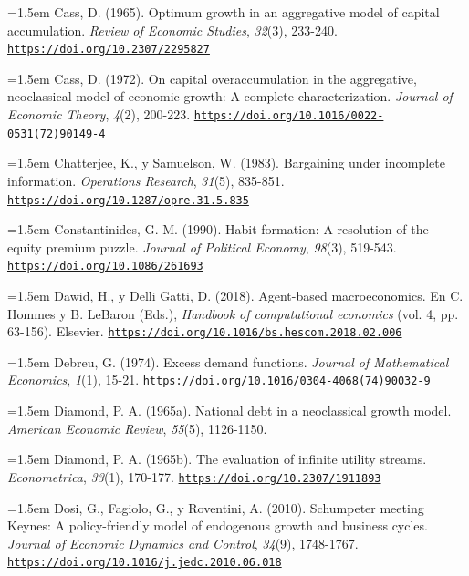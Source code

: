 \documentclass[10pt,a4paper]{article}
\begin{document}
\noindent\hangindent=1.5em Cass, D. (1965). Optimum growth in an aggregative model of capital accumulation. \textit{Review of Economic Studies}, \textit{32}(3), 233-240. \href{https://doi.org/10.2307/2295827}{\nolinkurl{https://doi.org/10.2307/2295827}}

\noindent\hangindent=1.5em Cass, D. (1972). On capital overaccumulation in the aggregative, neoclassical model of economic growth: A complete characterization. \textit{Journal of Economic Theory}, \textit{4}(2), 200-223. \href{https://doi.org/10.1016/0022-0531(72)90149-4}{\nolinkurl{https://doi.org/10.1016/0022-0531(72)90149-4}}

\noindent\hangindent=1.5em Chatterjee, K., y Samuelson, W. (1983). Bargaining under incomplete information. \textit{Operations Research}, \textit{31}(5), 835-851. \href{https://doi.org/10.1287/opre.31.5.835}{\nolinkurl{https://doi.org/10.1287/opre.31.5.835}}

\noindent\hangindent=1.5em Constantinides, G. M. (1990). Habit formation: A resolution of the equity premium puzzle. \textit{Journal of Political Economy}, \textit{98}(3), 519-543. \href{https://doi.org/10.1086/261693}{\nolinkurl{https://doi.org/10.1086/261693}}

\noindent\hangindent=1.5em Dawid, H., y Delli Gatti, D. (2018). Agent-based macroeconomics. En C. Hommes y B. LeBaron (Eds.), \textit{Handbook of computational economics} (vol. 4, pp. 63-156). Elsevier. \href{https://doi.org/10.1016/bs.hescom.2018.02.006}{\nolinkurl{https://doi.org/10.1016/bs.hescom.2018.02.006}}

\noindent\hangindent=1.5em Debreu, G. (1974). Excess demand functions. \textit{Journal of Mathematical Economics}, \textit{1}(1), 15-21. \href{https://doi.org/10.1016/0304-4068(74)90032-9}{\nolinkurl{https://doi.org/10.1016/0304-4068(74)90032-9}}

\noindent\hangindent=1.5em Diamond, P. A. (1965a). National debt in a neoclassical growth model. \textit{American Economic Review}, \textit{55}(5), 1126-1150.

\noindent\hangindent=1.5em Diamond, P. A. (1965b). The evaluation of infinite utility streams. \textit{Econometrica}, \textit{33}(1), 170-177. \href{https://doi.org/10.2307/1911893}{\nolinkurl{https://doi.org/10.2307/1911893}}

\noindent\hangindent=1.5em Dosi, G., Fagiolo, G., y Roventini, A. (2010). Schumpeter meeting Keynes: A policy-friendly model of endogenous growth and business cycles. \textit{Journal of Economic Dynamics and Control}, \textit{34}(9), 1748-1767. \href{https://doi.org/10.1016/j.jedc.2010.06.018}{\nolinkurl{https://doi.org/10.1016/j.jedc.2010.06.018}}
\end{document}
